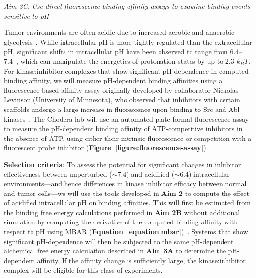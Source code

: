 \documentclass[11pt]{article}
\begin{document}
{\emph{Aim 3C. Use direct fluorescence binding affinity assays to examine binding events sensitive to pH}

Tumor environments are often acidic due to increased aerobic and anaerobic glycolysis~\cite{song-griffin-park}.
While intracellular pH is more tightly regulated than the extracellular pH, significant shifts in intracellular pH have been observed to range from 6.4--7.4~\cite{song-griffin-park}, which can manipulate the energetics of protonation states by up to 2.3 $k_B T$.
For kinase:inhibitor complexes that show significant pH-dependence in computed binding affinity, we will measure pH-dependent binding affinities using a fluorescence-based affinity assay originally developed by collaborator Nicholas Levinson (University of Minnesota), who observed that inhibitors with certain scaffolds undergo a large increase in fluorescence upon binding to Src and Abl kinases~\cite{levinson-boxer:plos-one:2012:bosutinib}.
The Chodera lab will use an automated plate-format fluorescence assay to measure the pH-dependent binding affinity of ATP-competitive inhibitors in the absence of ATP, using either their intrinsic fluorescence or competition with a fluorescent probe inhibitor ({\bf Figure~\ref{figure:fluorescence-assay}}).

\eject

{\bf Selection criteria:}
To assess the potential for significant changes in inhibitor effectiveness between unperturbed ($\sim$7.4) and acidified ($\sim$6.4) intracellular environments---and hence differences in kinase inhibitor efficacy between normal and tumor cells---we will use the tools developed in {\bf Aim 2} to compute the effect of acidified intracellular pH on binding affinities.
This will first be estimated from the binding free energy calculations performed in {\bf Aim 2B} without additional simulation by computing the derivative of the computed binding affinity with respect to pH using MBAR ({\bf Equation~\ref{equation:mbar}})~\cite{shirts-chodera:jcp:2008:mbar}.
Systems that show significant pH-dependence will then be subjected to the same pH-dependent alchemical free energy calculation described in {\bf Aim 3A} to determine the pH-dependent affinity.
If the affinity change is sufficiently large, the kinase:inhibitor complex will be eligible for this class of experiments.

\begin{figure}[t]
\begin{centering}


\end{centering}
\end{figure}}
\end{document}
